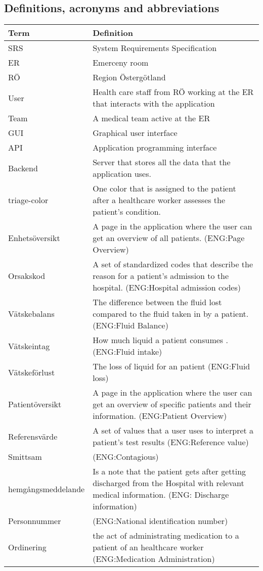 \subsection{Definitions, acronyms and abbreviations}

\begin{tabularx}{1.0\textwidth} { 
  | >{\raggedright\arraybackslash}X 
  | >{\raddedright\arraybackslash}X 
  | }
 \hline
 \textbf{Term} & \textbf{Definition}\\
 \hline
 SRS  & System Requirements Specification  \\
 \hline
 ER & Emerceny room \\
 \hline
RÖ & Region Östergötland \\
\hline
User & Health care staff from RÖ working at the ER that interacts with the application \\
\hline
Team & A medical team active at the ER \\
\hline
GUI & Graphical user interface \\
\hline
API & Application programming interface \\\hline
Backend & Server that stores all the data that the application uses. \\ 
\hline
triage-color &  One color that is assigned to the patient after a healthcare worker assesses the patient's condition.\\
\hline
Enhetsöversikt &  A page in the application where the user can get an overview of all patients. (ENG:Page Overview)\\
\hline
Orsakskod & A set of standardized codes that describe the reason for a patient's admission to the hospital. (ENG:Hospital admission codes) \\
\hline
Vätskebalans & The difference between the fluid lost compared to the fluid taken in by a patient. (ENG:Fluid Balance)\\
\hline
Vätskeintag & How much liquid a patient consumes . (ENG:Fluid intake)\\
\hline
Vätskeförlust & The loss of liquid for an patient  (ENG:Fluid loss)\\
\hline
Patientöversikt & A page in the application where the user can get an overview of specific patients and their information. (ENG:Patient Overview)\\
\hline
Referensvärde & A set of values that a user uses to interpret a patient's test results (ENG:Reference value)\\
\hline
Smittsam & (ENG:Contagious)\\
\hline
hemgångsmeddelande & Is a note that the patient gets after getting discharged from the Hospital with relevant medical information. (ENG: Discharge information)\\
\hline
Personnummer & (ENG:National identification number)\\
\hline
Ordinering & the act of administrating medication to a patient of an healthcare worker
 (ENG:Medication Administration)\\
\hline
\end{tabularx}

